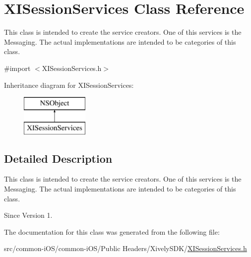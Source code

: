 \hypertarget{interface_x_i_session_services}{}\section{X\+I\+Session\+Services Class Reference}
\label{interface_x_i_session_services}


This class is intended to create the service creators. One of this services is the Messaging. The actual implementations are intended to be categories of this class.  




{\ttfamily \#import $<$X\+I\+Session\+Services.\+h$>$}

Inheritance diagram for X\+I\+Session\+Services\+:\begin{figure}[H]
\begin{center}
\leavevmode
\includegraphics[height=2.000000cm]{interface_x_i_session_services}
\end{center}
\end{figure}


\subsection{Detailed Description}
This class is intended to create the service creators. One of this services is the Messaging. The actual implementations are intended to be categories of this class. 

\begin{DoxySince}{Since}
Version 1. 
\end{DoxySince}


The documentation for this class was generated from the following file\+:\begin{DoxyCompactItemize}
\item 
src/common-\/i\+O\+S/common-\/i\+O\+S/\+Public Headers/\+Xively\+S\+D\+K/\hyperlink{_x_i_session_services_8h}{X\+I\+Session\+Services.\+h}\end{DoxyCompactItemize}
